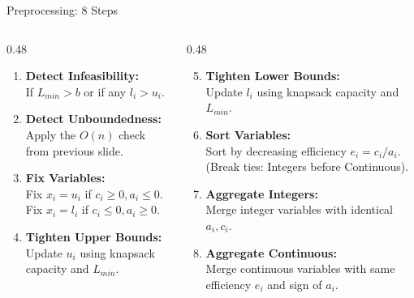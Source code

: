 \documentclass[aspectratio=169,xcolor=dvipsnames]{beamer}
\begin{document}
\begin{frame}{Preprocessing: 8 Steps}
    \small
    \setlength{\itemsep}{0.5pt} %
    \vspace{-0.5cm}
    \begin{columns}[T]
        \begin{column}{0.48\textwidth}
            \begin{enumerate}
                \item \textbf{Detect Infeasibility:} \\
                If $L_{min} > b$ or if any $l_i > u_i$.
                
                \item \textbf{Detect Unboundedness:} \\
                Apply the $O(n)$ check from previous slide.
                
                \item \textbf{Fix Variables:} \\
                Fix $x_i = u_i$ if $c_i \geq 0, a_i \leq 0$. \\
                Fix $x_i = l_i$ if $c_i \leq 0, a_i \geq 0$.
                
                \item \textbf{Tighten Upper Bounds:} \\
                Update $u_i$ using knapsack capacity and $L_{min}$.
            \end{enumerate}
        \end{column}
        \hspace{0.2cm} %
        \begin{column}{0.48\textwidth}
            \begin{enumerate}
                \setcounter{enumi}{4}
                \item \textbf{Tighten Lower Bounds:} \\
                Update $l_i$ using knapsack capacity and $L_{min}$.
                
                \item \textbf{Sort Variables:} \\
                Sort by decreasing efficiency $e_i = c_i/a_i$. \\
                (Break ties: Integers before Continuous).
                
                \item \textbf{Aggregate Integers:} \\
                Merge integer variables with identical $a_i, c_i$.
                
                \item \textbf{Aggregate Continuous:} \\
                Merge continuous variables with same efficiency $e_i$ and sign of $a_i$.
            \end{enumerate}
        \end{column}
    \end{columns}
\end{frame}
\end{document}
